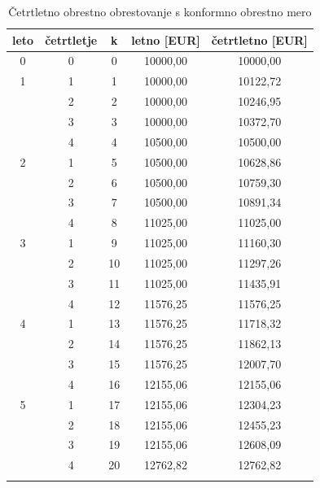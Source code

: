 \documentclass[12pt]{article}
\begin{document}
        \begin{longtable}{|c|c|c|c|c|}
            \hline
            \textbf{leto} & \textbf{četrtletje} & \textbf{k} & \textbf{letno [EUR]} & \textbf{četrtletno [EUR]} \\ \hline
            \endfirsthead
            \endhead
            0 & 0 & 0  & 10000,00  & 10000,00  \\ \hline \hline
            1 & 1 & 1  & 10000,00  & 10122,72  \\ \hline
              & 2 & 2  & 10000,00  & 10246,95  \\ \hline
              & 3 & 3  & 10000,00  & 10372,70  \\ \hline
              & 4 & 4  & 10500,00  & 10500,00  \\ \hline \hline
            2 & 1 & 5  & 10500,00  & 10628,86  \\ \hline
              & 2 & 6  & 10500,00  & 10759,30  \\ \hline
              & 3 & 7  & 10500,00  & 10891,34  \\ \hline
              & 4 & 8  & 11025,00  & 11025,00  \\ \hline \hline
            3 & 1 & 9  & 11025,00  & 11160,30  \\ \hline
              & 2 & 10 & 11025,00  & 11297,26  \\ \hline
              & 3 & 11 & 11025,00  & 11435,91  \\ \hline
              & 4 & 12 & 11576,25  & 11576,25  \\ \hline \hline
            4 & 1 & 13 & 11576,25  & 11718,32  \\ \hline
              & 2 & 14 & 11576,25  & 11862,13  \\ \hline
              & 3 & 15 & 11576,25  & 12007,70  \\ \hline
              & 4 & 16 & 12155,06  & 12155,06  \\ \hline \hline
            5 & 1 & 17 & 12155,06  & 12304,23  \\ \hline
              & 2 & 18 & 12155,06  & 12455,23  \\ \hline
              & 3 & 19 & 12155,06  & 12608,09  \\ \hline
              & 4 & 20 & 12762,82  & 12762,82  \\ \hline
              \caption{Četrtletno obrestno obrestovanje s konformno obrestno mero}
        \end{longtable}
\end{document}
